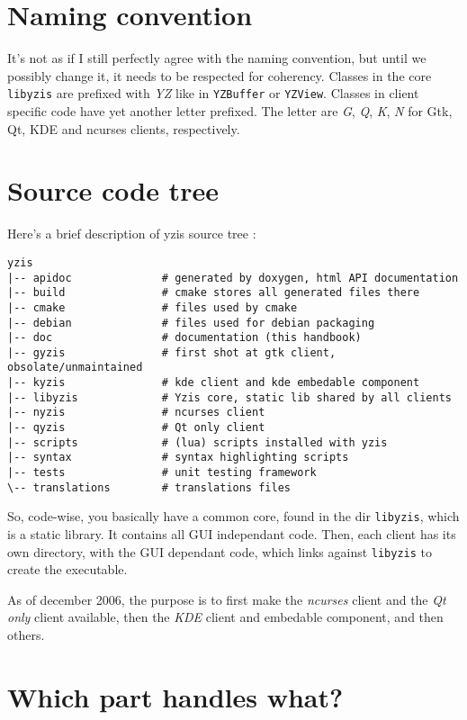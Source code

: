 \documentclass[a4paper,12pt]{report}
\begin{document}
\section{Naming convention}
It's not as if I still perfectly agree with the naming convention, but
until we possibly change it, it needs to be respected for coherency.
Classes in the core \verb+libyzis+ are prefixed with \emph{YZ} like in 
\verb+YZBuffer+ or \verb+YZView+.
Classes in client specific code have yet another letter prefixed. The
letter are \emph{G}, \emph{Q}, \emph{K}, \emph{N} for Gtk, Qt, KDE
and ncurses clients, respectively.

\section{Source code tree}
Here's a brief description of yzis source tree :
\begin{verbatim}
yzis
|-- apidoc              # generated by doxygen, html API documentation
|-- build               # cmake stores all generated files there
|-- cmake               # files used by cmake
|-- debian              # files used for debian packaging
|-- doc                 # documentation (this handbook)
|-- gyzis               # first shot at gtk client, obsolate/unmaintained
|-- kyzis               # kde client and kde embedable component
|-- libyzis             # Yzis core, static lib shared by all clients
|-- nyzis               # ncurses client
|-- qyzis               # Qt only client
|-- scripts             # (lua) scripts installed with yzis
|-- syntax              # syntax highlighting scripts
|-- tests               # unit testing framework
\-- translations        # translations files
\end{verbatim}

So, code-wise, you basically have a common core, found in the dir
\verb+libyzis+, which is a static library. It contains all GUI independant
code. Then, each client has its own directory, with the GUI dependant code,
which links against \verb+libyzis+ to create the executable.

As of december 2006, the purpose is to first make the \emph{ncurses} client
and the \emph{Qt only} client available, then the \emph{KDE} client and
embedable component, and then others.

\section{Which part handles what?}
\end{document}
